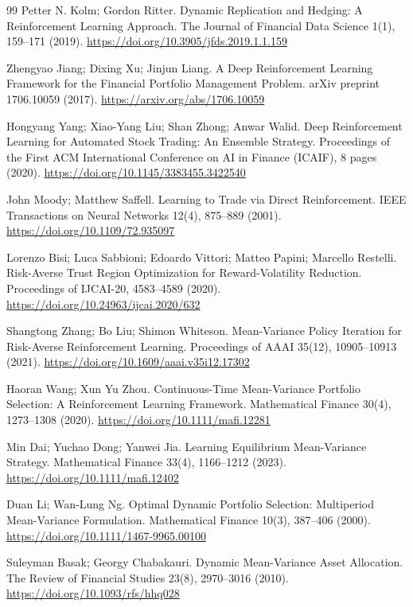 \documentclass[11pt,a4paper]{article}
\theoremstyle{plain}
\theoremstyle{definition}
\begin{document}
\clearpage
\begin{thebibliography}{99}
 Petter N. Kolm; Gordon Ritter. Dynamic Replication and Hedging: A Reinforcement Learning Approach. The Journal of Financial Data Science 1(1), 159--171 (2019). \url{https://doi.org/10.3905/jfds.2019.1.1.159}

 Zhengyao Jiang; Dixing Xu; Jinjun Liang. A Deep Reinforcement Learning Framework for the Financial Portfolio Management Problem. arXiv preprint 1706.10059 (2017). \url{https://arxiv.org/abs/1706.10059}

 Hongyang Yang; Xiao-Yang Liu; Shan Zhong; Anwar Walid. Deep Reinforcement Learning for Automated Stock Trading: An Ensemble Strategy. Proceedings of the First ACM International Conference on AI in Finance (ICAIF), 8 pages (2020). \url{https://doi.org/10.1145/3383455.3422540}

 John Moody; Matthew Saffell. Learning to Trade via Direct Reinforcement. IEEE Transactions on Neural Networks 12(4), 875--889 (2001). \url{https://doi.org/10.1109/72.935097}

 Lorenzo Bisi; Luca Sabbioni; Edoardo Vittori; Matteo Papini; Marcello Restelli. Risk-Averse Trust Region Optimization for Reward-Volatility Reduction. Proceedings of IJCAI-20, 4583--4589 (2020). \url{https://doi.org/10.24963/ijcai.2020/632}

 Shangtong Zhang; Bo Liu; Shimon Whiteson. Mean-Variance Policy Iteration for Risk-Averse Reinforcement Learning. Proceedings of AAAI 35(12), 10905--10913 (2021). \url{https://doi.org/10.1609/aaai.v35i12.17302}

 Haoran Wang; Xun Yu Zhou. Continuous-Time Mean-Variance Portfolio Selection: A Reinforcement Learning Framework. Mathematical Finance 30(4), 1273--1308 (2020). \url{https://doi.org/10.1111/mafi.12281}

 Min Dai; Yuchao Dong; Yanwei Jia. Learning Equilibrium Mean-Variance Strategy. Mathematical Finance 33(4), 1166--1212 (2023). \url{https://doi.org/10.1111/mafi.12402}

 Duan Li; Wan-Lung Ng. Optimal Dynamic Portfolio Selection: Multiperiod Mean-Variance Formulation. Mathematical Finance 10(3), 387--406 (2000). \url{https://doi.org/10.1111/1467-9965.00100}

 Suleyman Basak; Georgy Chabakauri. Dynamic Mean-Variance Asset Allocation. The Review of Financial Studies 23(8), 2970--3016 (2010). \url{https://doi.org/10.1093/rfs/hhq028}

\end{thebibliography}
\end{document}
